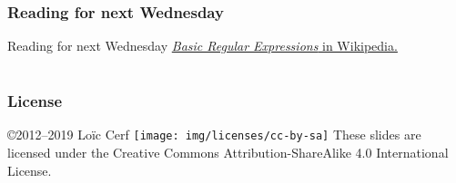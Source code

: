 \documentclass{beamer}
\begin{document}
\begin{frame}
  \frametitle{Reading for next Wednesday}


  \begin{alertblock}{Reading for next Wednesday}
    \href{https://pt.wikipedia.org/wiki/Express\%C3\%A3o\_regular\#BRE:_express.C3.B5es\_regulares\_b.C3.A1sicas}{\emph{Basic
        Regular Expressions} in Wikipedia.}
  \end{alertblock}
\end{frame}

\section*{}

\begin{frame}
  \frametitle{License}
  \begin{block}{\copyright 2012--2019 Loïc Cerf}
    \texttt{[image: img/licenses/cc-by-sa]}\hskip1pt
    These slides are licensed under the Creative Commons
    Attribution-ShareAlike 4.0 International License.
  \end{block}
\end{frame}
\end{document}
